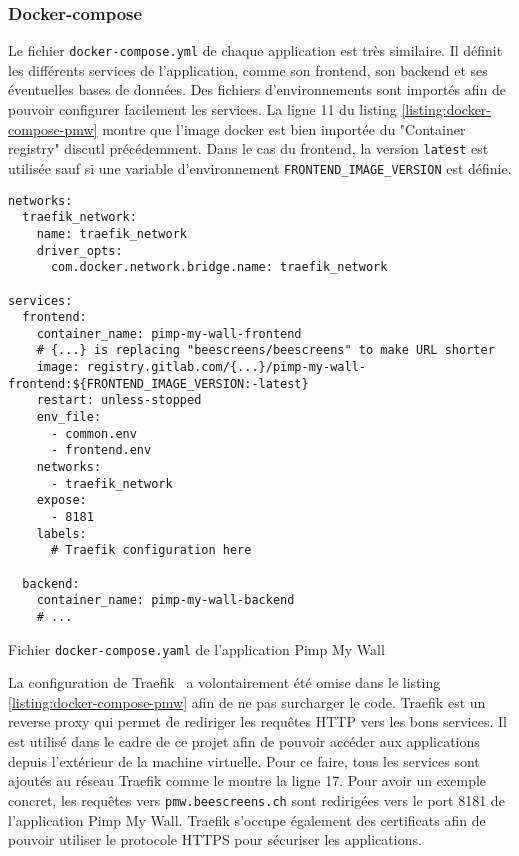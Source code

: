 \subsubsection{Docker-compose}

Le fichier \texttt{docker-compose.yml} de chaque application est très similaire. Il définit les différents services de l'application, comme son frontend, son backend et ses éventuelles bases de données. Des fichiers d'environnements sont importés afin de pouvoir configurer facilement les services. La ligne 11 du listing \ref{listing:docker-compose-pmw} montre que l'image \gls{docker} est bien importée du "Container registry" discutl précédemment. Dans le cas du frontend, la version \texttt{latest} est utilisée sauf si une variable d'environnement \texttt{FRONTEND\_IMAGE\_VERSION} est définie.

\begin{listing}[H]
  \begin{verbatim}
networks:
  traefik_network:
    name: traefik_network
    driver_opts:
      com.docker.network.bridge.name: traefik_network

services:
  frontend:
    container_name: pimp-my-wall-frontend
    # {...} is replacing "beescreens/beescreens" to make URL shorter
    image: registry.gitlab.com/{...}/pimp-my-wall-frontend:${FRONTEND_IMAGE_VERSION:-latest}
    restart: unless-stopped
    env_file:
      - common.env
      - frontend.env
    networks:
      - traefik_network
    expose:
      - 8181
    labels:
      # Traefik configuration here

  backend:
    container_name: pimp-my-wall-backend
    # ...
\end{verbatim}
  \caption{Fichier \texttt{docker-compose.yaml} de l'application Pimp My Wall}
  \label{listing:docker-compose-pmw}
\end{listing}

La configuration de Traefik~\cite{traefik} a volontairement été omise dans le listing \ref{listing:docker-compose-pmw} afin de ne pas surcharger le code. Traefik est un reverse proxy qui permet de rediriger les requêtes HTTP vers les bons services. Il est utilisé dans le cadre de ce projet afin de pouvoir accéder aux applications depuis l'extérieur de la machine virtuelle. Pour ce faire, tous les services sont ajoutés au réseau Traefik comme le montre la ligne 17. Pour avoir un exemple concret, les requêtes vers \texttt{pmw.beescreens.ch} sont redirigées vers le port 8181 de l'application Pimp My Wall. Traefik s'occupe également des certificats afin de pouvoir utiliser le protocole HTTPS pour sécuriser les applications.


